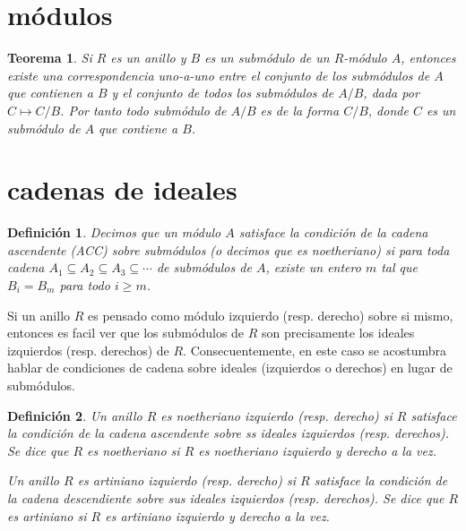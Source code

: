 \documentclass{report}
\newtheorem{theorem}{Teorema}
\newtheorem{definition}{Definición}
\begin{document}
  \section{módulos}
  \begin{theorem}
    \label{theorem:submodulesOfQuotientModule}
    Si \(R\) es un anillo y \(B\) es un submódulo de un \(R\)-módulo \(A\), entonces existe una correspondencia uno-a-uno entre el conjunto de los submódulos de \(A\) que contienen a \(B\) y el conjunto de todos los submódulos de \(A / B\), dada por \(C \mapsto C / B\).
    Por tanto todo submódulo de \(A / B\) es de la forma \(C / B\), donde \(C\) es un submódulo de \(A\) que contiene a \(B\).
  \end{theorem}


  \section{cadenas de ideales}

  \begin{definition}
    Decimos que un módulo \(A\) satisface la \emph{condición de la cadena ascendente (ACC) sobre submódulos} (o decimos que es \emph{noetheriano}) si para toda cadena \(A_1 \subseteq A_2 \subseteq A_3 \subseteq \cdots\) de submódulos de \(A\), existe un entero \(m\) tal que \(B_i = B_m\) para todo \(i \geq m\).
  \end{definition}

  Si un anillo \(R\) es pensado como módulo izquierdo (resp. derecho) sobre si mismo, entonces es facil ver que los submódulos de \(R\) son precisamente los ideales izquierdos (resp. derechos) de \(R\).
  Consecuentemente, en este caso se acostumbra hablar de condiciones de cadena sobre ideales (izquierdos o derechos) en lugar de submódulos.

  \begin{definition}
    Un anillo \(R\) es \emph{noetheriano izquierdo} (resp. \emph{derecho}) si \(R\) satisface la condición de la cadena ascendente sobre ss ideales izquierdos (resp. derechos).
    Se dice que \(R\) es \emph{noetheriano} si \(R\) es noetheriano izquierdo y derecho a la vez.

    Un anillo \(R\) es \emph{artiniano izquierdo} (resp. \emph{derecho}) si \(R\) satisface la condición de la cadena descendiente sobre sus ideales izquierdos (resp. derechos).
    Se dice que \(R\) es artiniano si \(R\) es artiniano izquierdo y derecho a la vez.
  \end{definition}
\end{document}
